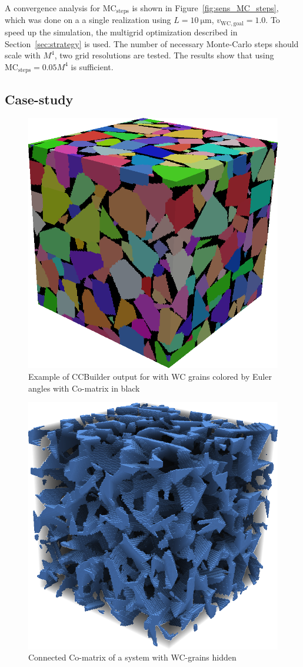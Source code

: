 \documentclass[3p,12pt]{elsarticle}
\newcommand{\WC}{\mathrm{WC}}
\begin{document}
A convergence analysis for $\text{MC}_\text{steps}$ is shown in Figure~\ref{fig:sens_MC_steps}, which was done on a a single realization using $L = \SI{10}{\micro\meter}$, $v_{\WC,\text{goal}} = 1.0$.
To speed up the simulation, the multigrid optimization described in Section~\ref{sec:strategy} is used.
The number of necessary Monte-Carlo steps should scale with $M^4$, two grid resolutions are tested.
%
%
The results show that using $\text{MC}_\text{steps} = 0.05 M^4$ is sufficient.



\subsection{Case-study}


\begin{figure}[htbp!]
 \centering
 \includegraphics[width=0.5\linewidth]{WC_IPF}
 \caption{Example of CCBuilder output for with WC grains colored by Euler angles with Co-matrix in black} \label{fig:final_example}
\end{figure}

\begin{figure}[htbp!]
 \centering
 \includegraphics[width=0.5\linewidth]{co_matrix}
 \caption{Connected Co-matrix of a system with WC-grains hidden} \label{fig:final_example_co}
\end{figure}
\end{document}

